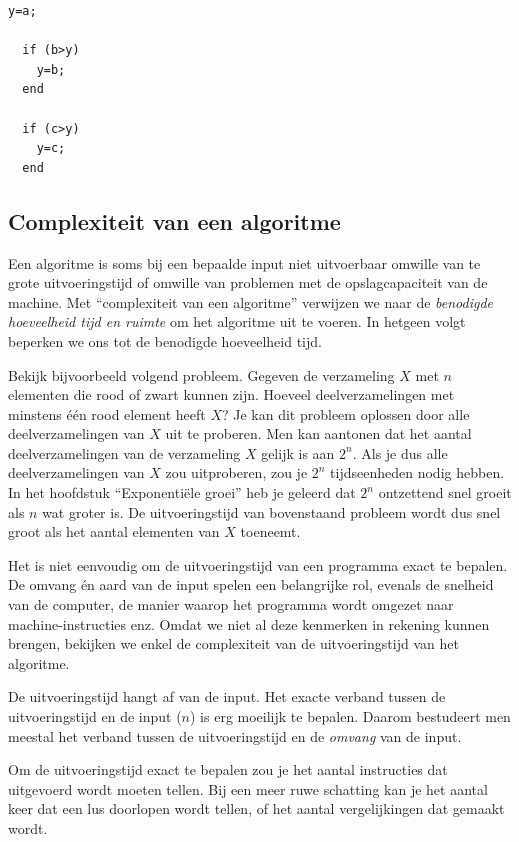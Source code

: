 \begin{lstlisting}[caption={Vind het maximum van drie getallen \lstinline{a}, \lstinline{b} en \lstinline{c}}, label={lst:max}]
  y=a;
  
  if (b>y)
    y=b;
  end
  
  if (c>y)
    y=c;
  end
\end{lstlisting}

\subsection{Complexiteit van een algoritme}

Een algoritme is soms bij een bepaalde input niet uitvoerbaar omwille van te grote uitvoeringstijd of omwille van problemen met de opslagcapaciteit van de machine.  Met  ``complexiteit van een algoritme'' verwijzen we naar de  \emph{benodigde hoeveelheid tijd  en ruimte} om het algoritme uit te voeren. In hetgeen volgt beperken we ons tot de benodigde hoeveelheid tijd.

Bekijk bijvoorbeeld volgend probleem. Gegeven de verzameling $X$ met $n$ elementen die rood of zwart kunnen zijn. Hoeveel deelverzamelingen met minstens één rood element heeft $X$? Je kan dit probleem oplossen door alle deelverzamelingen van $X$ uit te proberen. Men kan aantonen dat het aantal deelverzamelingen van de verzameling $X$ gelijk is aan $2^n$. Als je dus alle deelverzamelingen van $X$ zou uitproberen, zou je $2^n$ tijdseenheden nodig hebben. In het hoofdstuk ``Exponentiële groei'' heb je geleerd dat $2^n$ ontzettend snel groeit als $n$ wat groter is. De uitvoeringstijd van bovenstaand probleem wordt dus snel groot als het aantal elementen van $X$ toeneemt.

Het is niet eenvoudig om de uitvoeringstijd van een programma exact te bepalen. De  omvang én aard van de  input spelen een belangrijke rol, evenals de snelheid van de computer, de manier waarop het programma wordt omgezet naar machine-instructies enz. Omdat we niet al deze kenmerken 
in rekening kunnen brengen, bekijken we enkel de complexiteit van de uitvoeringstijd van het algoritme.

De uitvoeringstijd hangt af van de input.  Het exacte verband tussen de uitvoeringstijd en de input ($n$) is erg moeilijk te bepalen. Daarom bestudeert men meestal het verband tussen de uitvoeringstijd en de \emph{omvang} van de input. 

Om de uitvoeringstijd exact te bepalen zou je het aantal instructies dat uitgevoerd wordt moeten tellen. Bij een meer ruwe schatting kan je het aantal keer dat een lus doorlopen wordt tellen, of het aantal vergelijkingen dat gemaakt wordt.

